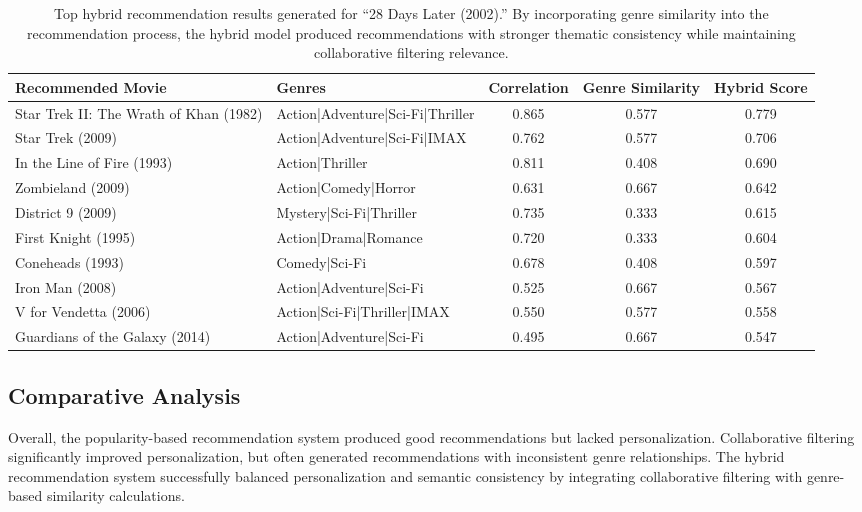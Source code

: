 \documentclass{article}
\begin{document}
\begin{table}[ht]
\centering
\small
\begin{tabular}{|p{3.8cm}|p{4.2cm}|c|c|c|}
\hline
\textbf{Recommended Movie} & \textbf{Genres} & \textbf{Correlation} & \textbf{Genre Similarity} & \textbf{Hybrid Score} \\
\hline
Star Trek II: The Wrath of Khan (1982) & Action|Adventure|Sci-Fi|Thriller & 0.865 & 0.577 & 0.779 \\
\hline
Star Trek (2009) & Action|Adventure|Sci-Fi|IMAX & 0.762 & 0.577 & 0.706 \\
\hline
In the Line of Fire (1993) & Action|Thriller & 0.811 & 0.408 & 0.690 \\
\hline
Zombieland (2009) & Action|Comedy|Horror & 0.631 & 0.667 & 0.642 \\
\hline
District 9 (2009) & Mystery|Sci-Fi|Thriller & 0.735 & 0.333 & 0.615 \\
\hline
First Knight (1995) & Action|Drama|Romance & 0.720 & 0.333 & 0.604 \\
\hline
Coneheads (1993) & Comedy|Sci-Fi & 0.678 & 0.408 & 0.597 \\
\hline
Iron Man (2008) & Action|Adventure|Sci-Fi & 0.525 & 0.667 & 0.567 \\
\hline
V for Vendetta (2006) & Action|Sci-Fi|Thriller|IMAX & 0.550 & 0.577 & 0.558 \\
\hline
Guardians of the Galaxy (2014) & Action|Adventure|Sci-Fi & 0.495 & 0.667 & 0.547 \\
\hline
\end{tabular}
\caption{Top hybrid recommendation results generated for ``28 Days Later (2002).'' By incorporating genre similarity into the recommendation process, the hybrid model produced recommendations with stronger thematic consistency while maintaining collaborative filtering relevance.}
\label{tab:hybrid_recommendations}
\end{table}


\subsection{Comparative Analysis}

Overall, the popularity-based recommendation system produced good recommendations but lacked personalization. Collaborative filtering significantly improved personalization, but often generated recommendations with inconsistent genre relationships. The hybrid recommendation system successfully balanced personalization and semantic consistency by integrating collaborative filtering with genre-based similarity calculations.
\end{document}
